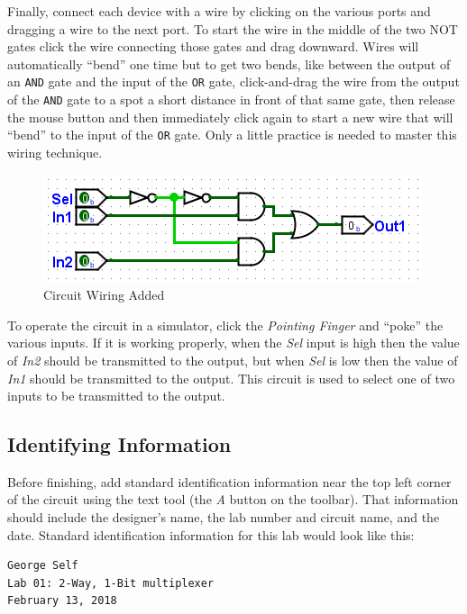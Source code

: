 Finally, connect each device with a wire by clicking on the various ports and dragging a wire to the next port. To start the wire in the middle of the two NOT gates click the wire connecting those gates and drag downward. Wires will automatically ``bend'' one time but to get two bends, like between the output of an \texttt{AND} gate and the input of the \texttt{OR} gate, click-and-drag the wire from the output of the \texttt{AND} gate to a spot a short distance in front of that same gate, then release the mouse button and then immediately click again to start a new wire that will ``bend'' to the input of the \texttt{OR} gate. Only a little practice is needed to master this wiring technique.

\begin{figure}[H]
	\centering
	\includegraphics[width=\maxwidth{.95\linewidth}]{gfx/01-07}
	\caption{Circuit Wiring Added}
	\label{fig:01-07}
\end{figure}

To operate the circuit in a simulator, click the \textit{Pointing Finger} and ``poke'' the various inputs. If it is working properly, when the \textit{Sel} input is high then the value of \textit{In2} should be transmitted to the output, but when \textit{Sel} is low then the value of \textit{In1} should be transmitted to the output. This circuit is used to select one of two inputs to be transmitted to the output.

\subsection{Identifying Information}

Before finishing, add standard identification information near the top left corner of the circuit using the text tool (the \textit{A} button on the toolbar). That information should include the designer's name, the lab number and circuit name, and the date. Standard identification information for this lab would look like this:

\bigskip
\begin{minipage}{\linewidth}
\begin{verbatim}
George Self
Lab 01: 2-Way, 1-Bit multiplexer
February 13, 2018
\end{verbatim}
\end{minipage}
\bigskip

